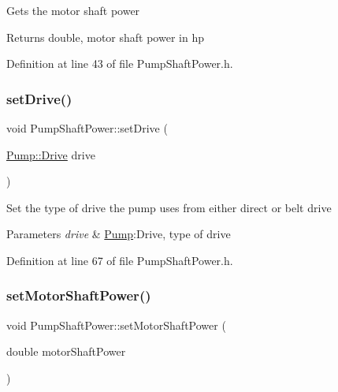 Gets the motor shaft power \begin{DoxyReturn}{Returns}
double, motor shaft power in hp 
\end{DoxyReturn}


Definition at line 43 of file Pump\+Shaft\+Power.\+h.

\mbox{\label{class_pump_shaft_power_a2c35a110c65c582a6f7d1d4c714f8187}} 
\subsubsection{\texorpdfstring{set\+Drive()}{setDrive()}}
{\footnotesize\ttfamily void Pump\+Shaft\+Power\+::set\+Drive (\begin{DoxyParamCaption}\item[{\hyperlink{class_pump_a32bf0ade131a11bb3b3fb374f638e983}{Pump\+::\+Drive}}]{drive }\end{DoxyParamCaption})\hspace{0.3cm}{\ttfamily [inline]}}

Set the type of drive the pump uses from either direct or belt drive 
\begin{DoxyParams}{Parameters}
{\em drive} & \hyperlink{class_pump}{Pump}\+:Drive, type of drive \\
\hline
\end{DoxyParams}


Definition at line 67 of file Pump\+Shaft\+Power.\+h.

\mbox{\label{class_pump_shaft_power_a77b8c621c7c92841dbd00112437c413b}} 
\subsubsection{\texorpdfstring{set\+Motor\+Shaft\+Power()}{setMotorShaftPower()}}
{\footnotesize\ttfamily void Pump\+Shaft\+Power\+::set\+Motor\+Shaft\+Power (\begin{DoxyParamCaption}\item[{double}]{motor\+Shaft\+Power }\end{DoxyParamCaption})\hspace{0.3cm}{\ttfamily [inline]}}

